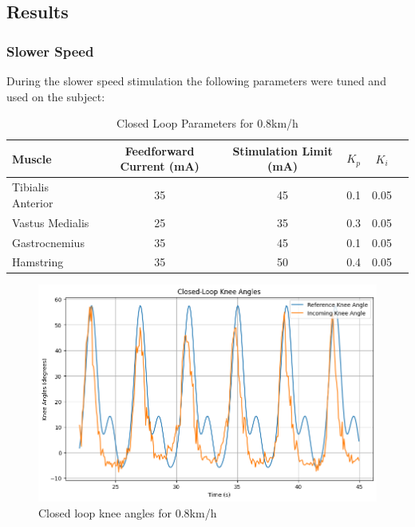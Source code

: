 \subsection{Results}
\subsubsection{Slower Speed}
During the slower speed stimulation the following parameters were tuned and used on the subject:

\begin{table}[h!]
\centering
\caption{Closed Loop Parameters for 0.8km/h}
\begin{tabular}{|l|c|c|c|c|c|}
\hline
\textbf{Muscle} & \textbf{Feedforward Current (mA)} & \textbf{Stimulation Limit (mA)} & \textbf{$K_p$} & \textbf{$K_i$} \\ \hline
Tibialis Anterior  & 35 & 45 & 0.1 & 0.05 \\ \hline
Vastus Medialis    & 25 & 35 & 0.3 & 0.05 \\ \hline
Gastrocnemius      & 35 & 45 & 0.1 & 0.05 \\ \hline
Hamstring          & 35 & 50 & 0.4 & 0.05 \\ \hline
\end{tabular}
\label{tab:closed_loop_9}
\end{table}

\begin{figure} [H]
    \centering
    \includegraphics[width=0.95\linewidth]{images/CL9refpng.png}
    \caption{Closed loop knee angles for 0.8km/h}
    \label{fig:cl9ref}
\end{figure}

